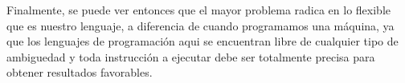 \documentclass{article}
\begin{document}
\noindent
Finalmente, se puede ver entonces que el mayor problema radica en lo flexible que es nuestro lenguaje, a diferencia de cuando programamos una máquina, ya que los lenguajes de programación aqui se encuentran libre de cualquier tipo de ambiguedad y toda instrucción a ejecutar debe ser totalmente precisa para obtener resultados favorables. 
\end{document}
